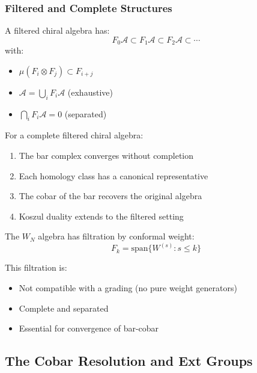 \subsubsection{Filtered and Complete Structures}

\begin{definition}
A filtered chiral algebra has:
$$F_0\mathcal{A} \subset F_1\mathcal{A} \subset F_2\mathcal{A} \subset \cdots$$
with:
\begin{itemize}
\item $\mu(F_i \otimes F_j) \subset F_{i+j}$
\item $\mathcal{A} = \bigcup_i F_i\mathcal{A}$ (exhaustive)
\item $\bigcap_i F_i\mathcal{A} = 0$ (separated)
\end{itemize}
\end{definition}

\begin{theorem}
For a complete filtered chiral algebra:
\begin{enumerate}
\item The bar complex converges without completion
\item Each homology class has a canonical representative
\item The cobar of the bar recovers the original algebra
\item Koszul duality extends to the filtered setting
\end{enumerate}
\end{theorem}

\begin{example}
The $W_N$ algebra has filtration by conformal weight:
$$F_k = \text{span}\{W^{(s)} : s \leq k\}$$

This filtration is:
\begin{itemize}
\item Not compatible with a grading (no pure weight generators)
\item Complete and separated
\item Essential for convergence of bar-cobar
\end{itemize}
\end{example}


\subsection{The Cobar Resolution and Ext Groups}

